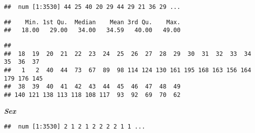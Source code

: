 \documentclass[
]{article}
\newenvironment{Shaded}{\begin{snugshade}}{\end{snugshade}}
\newcommand{\CommentTok}[1]{\textcolor[rgb]{0.56,0.35,0.01}{\textit{#1}}}
\newcommand{\FunctionTok}[1]{\textcolor[rgb]{0.13,0.29,0.53}{\textbf{#1}}}
\newcommand{\NormalTok}[1]{#1}
\newcommand{\SpecialCharTok}[1]{\textcolor[rgb]{0.81,0.36,0.00}{\textbf{#1}}}
\begin{document}
\begin{verbatim}
##  num [1:3530] 44 25 40 20 29 44 29 21 36 29 ...
\end{verbatim}

\begin{Shaded}
\end{Shaded}

\begin{verbatim}
##    Min. 1st Qu.  Median    Mean 3rd Qu.    Max. 
##   18.00   29.00   34.00   34.59   40.00   49.00
\end{verbatim}

\begin{Shaded}
\end{Shaded}

\begin{verbatim}
## 
##  18  19  20  21  22  23  24  25  26  27  28  29  30  31  32  33  34  35  36  37 
##   1   2  40  44  73  67  89  98 114 124 130 161 195 168 163 156 164 179 176 145 
##  38  39  40  41  42  43  44  45  46  47  48  49 
## 140 121 138 113 118 108 117  93  92  69  70  62
\end{verbatim}

\textbf{\emph{Sex}}

\begin{Shaded}
\end{Shaded}

\begin{verbatim}
##  num [1:3530] 2 1 2 1 2 2 2 2 1 1 ...
\end{verbatim}

\begin{Shaded}
\end{Shaded}
\end{document}
